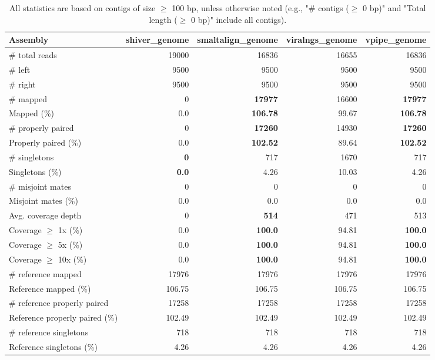 \documentclass[12pt,a4paper]{article}
\begin{document}
\begin{table}[ht]
\begin{center}
\caption{All statistics are based on contigs of size $\geq$ 100 bp, unless otherwise noted (e.g., "\# contigs ($\geq$ 0 bp)" and "Total length ($\geq$ 0 bp)" include all contigs).}
\begin{tabular}{|l*{4}{|r}|}
\hline
Assembly & shiver\_genome & smaltalign\_genome & viralngs\_genome & vpipe\_genome \\ \hline
\# total reads & 19000 & 16836 & 16655 & 16836 \\ \hline
\# left & 9500 & 9500 & 9500 & 9500 \\ \hline
\# right & 9500 & 9500 & 9500 & 9500 \\ \hline
\# mapped & 0 & {\bf 17977} & 16600 & {\bf 17977} \\ \hline
Mapped (\%) & 0.0 & {\bf 106.78} & 99.67 & {\bf 106.78} \\ \hline
\# properly paired & 0 & {\bf 17260} & 14930 & {\bf 17260} \\ \hline
Properly paired (\%) & 0.0 & {\bf 102.52} & 89.64 & {\bf 102.52} \\ \hline
\# singletons & {\bf 0} & 717 & 1670 & 717 \\ \hline
Singletons (\%) & {\bf 0.0} & 4.26 & 10.03 & 4.26 \\ \hline
\# misjoint mates & 0 & 0 & 0 & 0 \\ \hline
Misjoint mates (\%) & 0.0 & 0.0 & 0.0 & 0.0 \\ \hline
Avg. coverage depth & 0 & {\bf 514} & 471 & 513 \\ \hline
Coverage $\geq$ 1x (\%) & 0.0 & {\bf 100.0} & 94.81 & {\bf 100.0} \\ \hline
Coverage $\geq$ 5x (\%) & 0.0 & {\bf 100.0} & 94.81 & {\bf 100.0} \\ \hline
Coverage $\geq$ 10x (\%) & 0.0 & {\bf 100.0} & 94.81 & {\bf 100.0} \\ \hline
\# reference mapped & 17976 & 17976 & 17976 & 17976 \\ \hline
Reference mapped (\%) & 106.75 & 106.75 & 106.75 & 106.75 \\ \hline
\# reference properly paired & 17258 & 17258 & 17258 & 17258 \\ \hline
Reference properly paired (\%) & 102.49 & 102.49 & 102.49 & 102.49 \\ \hline
\# reference singletons & 718 & 718 & 718 & 718 \\ \hline
Reference singletons (\%) & 4.26 & 4.26 & 4.26 & 4.26 \\ \hline

\end{tabular}
\end{center}
\end{table}
\end{document}

